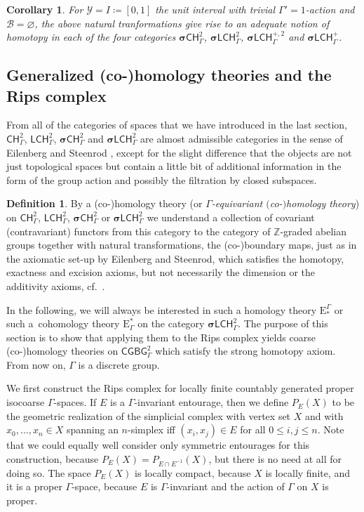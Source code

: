 \documentclass[pdftex]{sigma}
\numberwithin{equation}{section}
\newtheorem{cor}[thm]{Corollary}
\theoremstyle{definition}
\newtheorem{defn}[thm]{Definition}
\newcommand{\Z}{\mathbb{Z}}
\newcommand{\cY}{\mathcal{Y}}
\newcommand{\cB}{\mathcal{B}}
\newcommand{\categoryfont}[1]{\mathsf{#1}}
\newcommand{\sLCHz}[1][\Gamma]{\boldsymbol\sigma\categoryfont{LCH}_{#1}^2}
\newcommand{\sLCHp}[1][\Gamma]{\boldsymbol\sigma\categoryfont{LCH}_{#1}^+}
\newcommand{\sLCHzp}[1][\Gamma]{\boldsymbol\sigma\categoryfont{LCH}_{#1}^{+,2}}
\newcommand{\sCHz}[1][\Gamma]{\boldsymbol\sigma\categoryfont{CH}_{#1}^2}
\newcommand{\LCHz}[1][\Gamma]{\categoryfont{LCH}_{#1}^2}
\newcommand{\CHz}[1][\Gamma]{\categoryfont{CH}_{#1}^2}
\newcommand{\CGCBGz}[1][\Gamma]{\categoryfont{CGBG}^2_{#1}}
\newcommand{\Homol}{\mathrm{E}}
\newcommand{\Cohom}{\mathrm{E}}
\begin{document}
\begin{cor}
For $\cY=I\coloneqq[0,1]$ the unit interval with trivial $\Gamma'=1$-action and $\cB=\varnothing$, the above natural tranformations give rise to an adequate notion of homotopy in each of the four categories $\sCHz$, $\sLCHz$, $\sLCHzp$ and $\sLCHp$.
\end{cor}

\subsection{Generalized (co-)homology theories and the Rips complex}\label{sec:Ripscomplex}

From all of the categories of spaces that we have introduced in the last section, $\CHz$, $\LCHz$, $\sCHz$ and $\sLCHz$ are almost admissible categories in the sense of Eilenberg and Steenrod \cite[Section~I.1]{EilenbergSteenrod}, except for the slight difference that the objects are not just topological spaces but contain a little bit of additional information in the form of the group action and possibly the filtration by closed subspaces.

\begin{defn}
By a \mbox{(co-)}homology theory (or \emph{$\Gamma$-equivariant \mbox{$($co-$)$}homology theory}) on $\CHz$, $\LCHz$, $\sCHz$ or $\sLCHz$ we understand a collection of
 covariant (contravariant) functors from this category to the category of $\Z$-graded abelian groups together with natural transformations, the (co-)boundary maps, just as in the axiomatic set-up by Eilenberg and Steenrod,
which satisfies the homotopy, exactness and excision axioms, but not necessarily the dimension or the additivity axioms, cf.\ \cite[Sections I.3 and~I.3c]{EilenbergSteenrod}.
\end{defn}

In the following, we will always be interested in such a homology theory $\Homol^\Gamma_*$ or such a~coho\-mology theory $\Cohom_\Gamma^*$ on the category $\sLCHz$. The purpose of this section is to show that applying them to the Rips complex yields coarse \mbox{(co-)}homology theories on $\CGCBGz$ which satisfy the strong homotopy axiom. From now on, $\Gamma$ is a discrete group.

We first construct the Rips complex for locally finite countably generated proper isocoarse $\Gamma$-spaces. If $E$ is a $\Gamma$-invariant entourage, then we define $P_E(X)$ to be the geometric realization of the simplicial complex with vertex set $X$ and with $x_0,\dots,x_n\in X$ spanning an $n$-simplex iff $(x_i,x_j)\in E$ for all $0\leq i,j\leq n$.
Note that we could equally well consider only symmetric entourages for this construction, because $P_E(X)=P_{E\cap E^{-1}}(X)$, but there is no need at all for doing so.
The space $P_E(X)$ is locally compact, because $X$ is locally finite, and it is a proper $\Gamma$-space, because $E$ is $\Gamma$-invariant and the action of $\Gamma$ on $X$ is proper.
\end{document}
